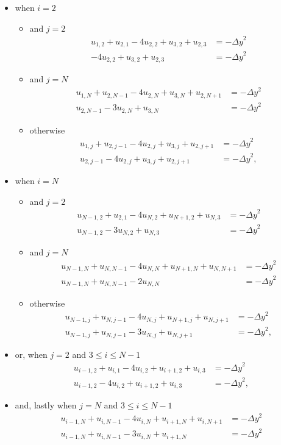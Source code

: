 \documentclass[11pt]{article}
\begin{document}
	\begin{itemize}
		\item when $ i = 2 $
		\begin{itemize}
			\item and $ j = 2 $
			\begin{align*}
				u_{1,2} + u_{2,1} - 4u_{2,2} + u_{3,2} + u_{2,3} &= -{\Delta y}^2\\
				- 4u_{2,2} + u_{3,2} + u_{2,3} &= -{\Delta y}^2
			\end{align*}
			\item and $ j = N $
			\begin{align*}
				u_{1,N} + u_{2,N-1} - 4u_{2,N} + u_{3,N} + u_{2,N+1} &= -{\Delta y}^2\\
				u_{2,N-1} - 3u_{2,N} + u_{3,N} &= -{\Delta y}^2
			\end{align*}
			\item otherwise
			\begin{align*}
				u_{1,j} + u_{2,j-1} - 4u_{2,j} + u_{3,j} + u_{2,j+1} &= -{\Delta y}^2\\
				u_{2,j-1} - 4u_{2,j} + u_{3,j} + u_{2,j+1} &= -{\Delta y}^2,
			\end{align*}
		\end{itemize}
		\item when $ i = N $
		\begin{itemize}
			\item and $ j = 2 $
			\begin{align*}
				u_{N-1,2} + u_{2,1} - 4u_{N,2} + u_{N+1,2} + u_{N,3} &= -{\Delta y}^2\\
				u_{N-1,2} - 3u_{N,2} + u_{N,3} &= -{\Delta y}^2
			\end{align*}
			\item and $ j = N $
			\begin{align*}
				u_{N-1,N} + u_{N,N-1} - 4u_{N,N} + u_{N+1,N} + u_{N,N+1} &= -{\Delta y}^2\\
				u_{N-1,N} + u_{N,N-1} - 2u_{N,N} &= -{\Delta y}^2
			\end{align*}
			\item otherwise
			\begin{align*}
				u_{N-1,j} + u_{N,j-1} - 4u_{N,j} + u_{N+1,j} + u_{N,j+1} &= -{\Delta y}^2\\
				u_{N-1,j} + u_{N,j-1} - 3u_{N,j} + u_{N,j+1} &= -{\Delta y}^2,
			\end{align*}
		\end{itemize}
		\item or, when $ j = 2 $ and $ 3\leq i\leq N-1 $
		\begin{align*}
			u_{i-1,2} + u_{i,1} - 4u_{i,2} + u_{i+1,2} + u_{i,3} &= -{\Delta y}^2\\
			u_{i-1,2} - 4u_{i,2} + u_{i+1,2} + u_{i,3} &= -{\Delta y}^2,
		\end{align*}
		\item and, lastly when $ j = N $ and $ 3\leq i\leq N-1 $
		\begin{align*}
			u_{i-1,N} + u_{i,N-1} - 4u_{i,N} + u_{i+1,N} + u_{i,N+1} &= -{\Delta y}^2\\
			u_{i-1,N} + u_{i,N-1} - 3u_{i,N} + u_{i+1,N} &= -{\Delta y}^2
		\end{align*}
	\end{itemize}
\end{document}
